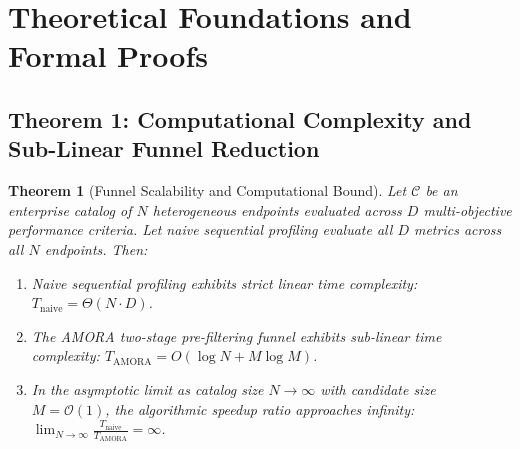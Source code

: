 \documentclass[journal,10pt,twocolumn]{IEEEtran}
\newtheorem{theorem}{Theorem}
\begin{document}
\section{Theoretical Foundations and Formal Proofs}
\label{sec:theoretical_proofs}

\subsection{Theorem 1: Computational Complexity and Sub-Linear Funnel Reduction}
\label{subsec:proof_complexity}

\begin{theorem}[Funnel Scalability and Computational Bound]
Let $\mathcal{C}$ be an enterprise catalog of $N$ heterogeneous endpoints evaluated across $D$ multi-objective performance criteria. Let naive sequential profiling evaluate all $D$ metrics across all $N$ endpoints. Then:
\begin{enumerate}
    \item Naive sequential profiling exhibits strict linear time complexity: $T_{\text{naive}} = \Theta(N \cdot D)$.
    \item The AMORA two-stage pre-filtering funnel exhibits sub-linear time complexity: $T_{\text{AMORA}} = O(\log N + M \log M)$.
    \item In the asymptotic limit as catalog size $N \to \infty$ with candidate size $M = \mathcal{O}(1)$, the algorithmic speedup ratio approaches infinity: $\lim_{N \to \infty} \frac{T_{\text{naive}}}{T_{\text{AMORA}}} = \infty$.
\end{enumerate}
\end{theorem}
\end{document}
